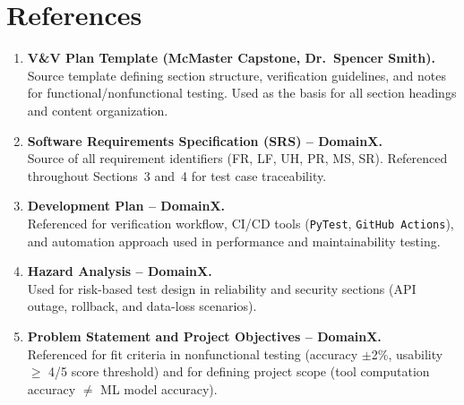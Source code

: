 \documentclass[12pt, titlepage]{article}
\begin{document}

					
					
					
					





\section{References}

\begin{enumerate}
  \item \textbf{V\&V Plan Template (McMaster Capstone, Dr.\ Spencer Smith).}\\
  Source template defining section structure, verification guidelines, and notes
  for functional/nonfunctional testing. Used as the basis for all section
  headings and content organization.

  \item \textbf{Software Requirements Specification (SRS) -- DomainX.}\\
  Source of all requirement identifiers (FR, LF, UH, PR, MS, SR). Referenced
  throughout Sections~3 and~4 for test case traceability.

  \item \textbf{Development Plan -- DomainX.}\\
  Referenced for verification workflow, CI/CD tools (\texttt{PyTest},
  \texttt{GitHub Actions}), and automation approach used in performance and
  maintainability testing.

  \item \textbf{Hazard Analysis -- DomainX.}\\
  Used for risk-based test design in reliability and security sections (API
  outage, rollback, and data-loss scenarios).

  \item \textbf{Problem Statement and Project Objectives -- DomainX.}\\
  Referenced for fit criteria in nonfunctional testing (accuracy $\pm$2\%,
  usability $\geq$ 4/5 score threshold) and for defining project scope
  (tool computation accuracy $\neq$ ML model accuracy).
\end{enumerate}
\end{document}
